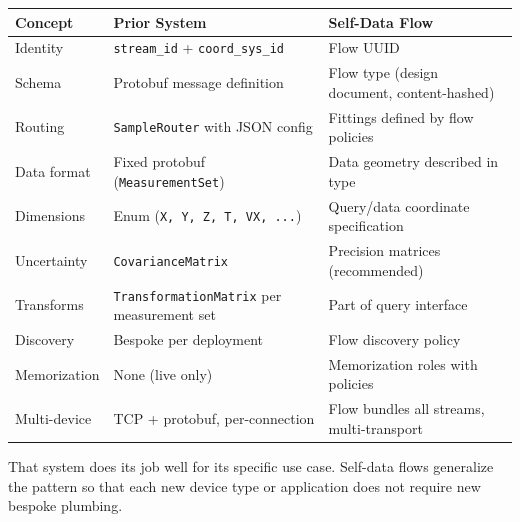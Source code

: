 \documentclass[11pt, letterpaper]{article}
\begin{document}
\begin{center}
\begin{tabularx}{\textwidth}{l X X}
\toprule
\textbf{Concept} & \textbf{Prior System} & \textbf{Self-Data Flow} \\
\midrule
Identity & \texttt{stream\_id} + \texttt{coord\_sys\_id} & Flow UUID \\
Schema & Protobuf message definition & Flow type (design document, content-hashed) \\
Routing & \texttt{SampleRouter} with JSON config & Fittings defined by flow policies \\
Data format & Fixed protobuf (\texttt{MeasurementSet}) & Data geometry described in type \\
Dimensions & Enum (\texttt{X, Y, Z, T, VX, ...}) & Query/data coordinate specification \\
Uncertainty & \texttt{CovarianceMatrix} & Precision matrices (recommended) \\
Transforms & \texttt{TransformationMatrix} per measurement set & Part of query interface \\
Discovery & Bespoke per deployment & Flow discovery policy \\
Memorization & None (live only) & Memorization roles with policies \\
Multi-device & TCP + protobuf, per-connection & Flow bundles all streams, multi-transport \\
\bottomrule
\end{tabularx}
\end{center}

That system does its job well for its specific use case. Self-data flows
generalize the pattern so that each new device type or application does not require
new bespoke plumbing.
\end{document}
